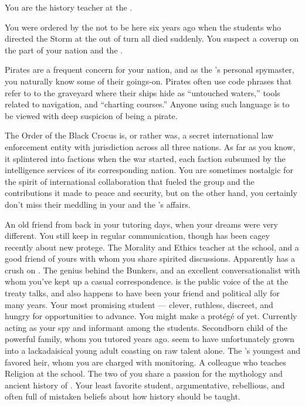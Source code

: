\documentclass[char]{GL2020}
\begin{document}
\begin{itemz}[Notes]
    \item You are the history teacher at the \pSchool{}.
    \item You were ordered by the \cQueen{\Monarch} not to be here six years ago when the students who directed the Storm at the \pShippies{} out of turn all died suddenly. You suspect a coverup on the part of your nation and the \pTech{}.
    \item Pirates are a frequent concern for your nation, and as the \cQueen{\Monarch}'s personal spymaster, you naturally know some of their goings-on. Pirates often use code phrases that refer to to the graveyard where their ships hide as ``untouched waters,'' tools related to navigation, and ``charting courses.'' Anyone using such language is to be viewed with deep suspicion of being a pirate.
    \item The Order of the Black Crocus is, or rather was, a secret international law enforcement entity with jurisdiction across all three nations. As far as you know, it splintered into factions when the war started, each faction subsumed by the intelligence services of its corresponding nation. You are sometimes nostalgic for the spirit of international collaboration that fueled the group and the contributions it made to peace and security, but on the other hand, you certainly don't miss their meddling in your and the \cQueen{\Monarch}'s affairs.
\end{itemz}

\begin{contacts}
    \contact{\cWildCard{}} An old friend from back in your tutoring days, when your dreams were very different. You still keep in regular communication, though \cWildCard{} has been cagey recently about \cWildCard{\their} new protege. 
    \contact{\cEthics{}} The Morality and Ethics teacher at the school, and a good friend of yours with whom you share spirited discussions. Apparently has a crush on \cBeetle{}.
    \contact{\cBunker{}} The genius behind the Bunkers, and an excellent conversationalist with whom you've kept up a casual correspondence.
    \contact{\cEvil{}} \cEvil{} is the public voice of the \cQueen{\Monarch} at the treaty talks, and also happens to have been your friend and political ally for many years.
    \contact{\cLibAssist{}} Your most promising student — clever, ruthless, discreet, and hungry for opportunities to advance. You might make a protégé of \cLibAssist{\them} yet. Currently acting as your spy and informant among the students.
    \contact{\cChupStudent{}} Secondborn child of the powerful \cChupStudent{\formal} family, whom you tutored years ago. \cChupStudent{\They} seem\cChupStudent{\verbs} to have unfortunately grown into a lackadaisical young adult coasting on raw talent alone.
    \contact{\cPrince{}} The \cQueen{\Monarch}'s youngest \cPrince{\offspring} and favored heir, whom you are charged with monitoring.
    \contact{\cBeetle{}} A colleague who teaches Religion at the school. The two of you share a passion for the mythology and ancient history of \pEarth{}.
    \contact{\cTechStar{}} Your least favorite student, argumentative, rebellious, and often full of mistaken beliefs about how history should be taught.
\end{contacts}
\end{document}
